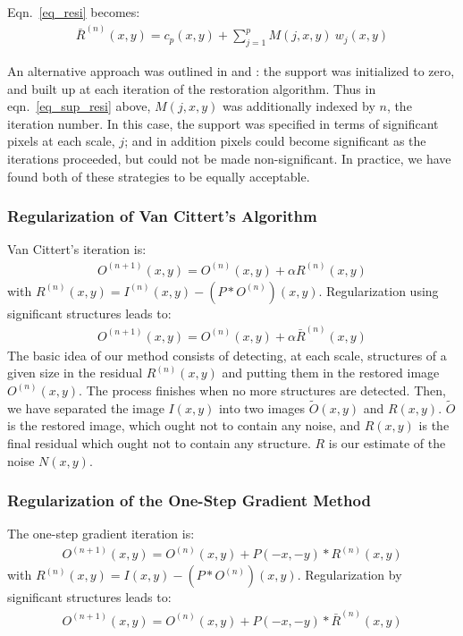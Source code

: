 \documentclass[11pt,a4paper]{article}
\begin{document}
Eqn.\ \ref{eq_resi} becomes:
\begin{eqnarray}
\bar{R}^{(n)}(x,y) = c_{p}(x,y) + \sum_{j=1}^{p} M(j,x,y) \  w_j(x,y)
\label{eq_sup_resi}
\end{eqnarray}
 
An alternative approach was outlined in \cite{starck:mur95_2} and 
\cite{starck:sta95_1}:
 the support was
initialized to zero, and built up at each iteration of the restoration 
algorithm.  Thus in eqn.\ \ref{eq_sup_resi} above, 
$M(j,x,y)$ was additionally
indexed by $n$, the iteration number.  In this case, the support was
specified in terms of significant pixels at each scale, $j$; and in addition
pixels could become significant as the iterations proceeded, but could not
be made non-significant.  In practice, we have found both of these strategies
to be equally acceptable.

\subsubsection{Regularization of Van Cittert's Algorithm}
 
Van Cittert's iteration \cite{rest:vancittert31} is:
\begin{eqnarray}
O^{(n+1)} (x,y) = O^{(n)} (x,y) + \alpha{R}^{(n)}(x,y) 
\end{eqnarray}
with ${R}^{(n)}(x,y) =  I^{(n)}(x,y) - (P * O^{(n)}) (x,y)$.
Regularization using significant structures leads to:
\begin{eqnarray}
O^{(n+1)} (x,y) = O^{(n)} (x,y) + \alpha {\bar{R}}^{(n)}(x,y) 
\end{eqnarray}
The basic idea of our method consists of detecting, at each scale,  
structures of a given size in
the residual $R^{(n)}(x,y)$ and putting them in the restored 
image $O^{(n)}(x,y)$. The
process finishes when no more structures are detected. Then, we have separated
the image $I(x,y)$ into two images $\tilde O(x,y)$ and $R(x,y)$.
 $\tilde O$ is the restored image, which ought not to contain any
noise, and  $R(x,y)$ is the final residual which ought  not to contain any 
structure. $R$ is our estimate of the noise $N(x,y)$.
 
\subsubsection{Regularization of the One-Step Gradient Method}
 
The one-step gradient iteration is:
\begin{eqnarray}
O^{(n+1)} (x,y) = O^{(n)} (x,y) + P(-x,-y) * {R}^{(n)}(x,y) 
\end{eqnarray}
with ${R}^{(n)}(x,y) = I(x,y) - (P * O^{(n)}) (x,y)$.
Regularization by significant structures leads to:
\begin{eqnarray}
O^{(n+1)} (x,y) = O^{(n)} (x,y) +  P(-x,-y) * {\bar{R}}^{(n)}(x,y)
\end{eqnarray}
 
\end{document}

